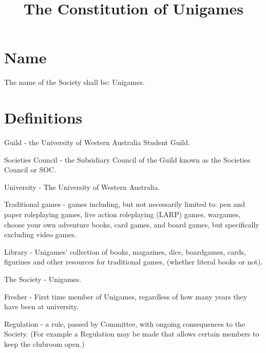 \documentclass[a4paper]{article}
\title{The Constitution of Unigames}
\author{}
\date{}
\begin{document}
\maketitle


\section{Name} \label{sec:name}
\begin{myEnumerate}
    \item The name of the Society shall be: Unigames.
\end{myEnumerate}


\section{Definitions} \label{sec:definitions}
\begin{myEnumerate}
    \item Guild - the University of Western Australia Student Guild.
    \item Societies Council - the Subsidiary Council of the Guild known as the Societies Council or SOC.
    \item University - The University of Western Australia.
    \item Traditional games - games including, but not necessarily limited to: pen and paper roleplaying games, live action roleplaying (LARP) games, wargames, choose your own adventure books, card games, and board games, but specifically excluding video games.
    \item Library - Unigames' collection of books, magazines, dice, boardgames, cards, figurines and other resources for traditional games, (whether literal books or not).
    \item The Society - Unigames.
    \item Fresher - First time member of Unigames, regardless of how many years they have been at university.
    \item Regulation - a rule, passed by Committee, with ongoing consequences to the Society. (For example a Regulation may be made that allows certain members to keep the clubroom open.)
\end{myEnumerate}
\end{document}
